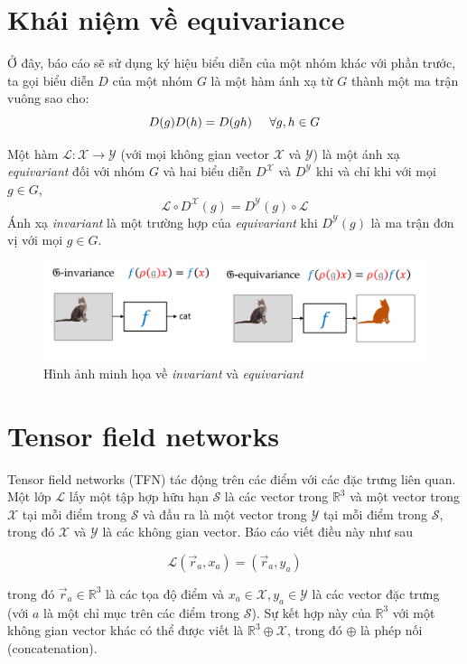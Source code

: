 \section{Khái niệm về equivariance}
Ở đây, báo cáo sẽ sử dụng ký hiệu biểu diễn của một nhóm khác với phần trước, ta gọi biểu diễn $D$ của một nhóm $G$ là một hàm ánh xạ từ $G$ thành một ma trận vuông sao cho:
$$D(g)D(h) = D(gh) \hspace{0.5cm} \forall g, h \in G$$

Một hàm $ \mathcal{L} : \mathcal{X} \to \mathcal{Y} $ (với mọi không gian vector $\mathcal{X}$ và $\mathcal{Y}$) là một ánh xạ \textit{equivariant} đối với nhóm $G$ và hai biểu diễn $D^{\mathcal{X}}$ và $D^{\mathcal{Y}}$ khi và chỉ khi với mọi $g \in G$,
$$\mathcal{L} \circ D^{\mathcal{X}}(g) = D^{\mathcal{Y}}(g) \circ \mathcal{L}$$
Ánh xạ \textit{invariant} là một trường hợp của \textit{equivariant} khi $D^{\mathcal{Y}}(g)$ là ma trận đơn vị với mọi $g \in G$.

\begin{figure}[H]
    \centering
    \includegraphics[width=1\linewidth]{Images/GDL/inva_equi.png}
    \caption{Hình ảnh minh họa về \textit{invariant} và \textit{equivariant}\cite{geometricdeep2022}}
\end{figure}

\section{Tensor field networks}
Tensor field networks (TFN) tác động trên các điểm với các đặc trưng liên quan. Một lớp \( \mathcal{L} \) lấy một tập hợp hữu hạn \( \mathcal{S} \) là các vector trong \( \mathbb{R}^3 \) và một vector trong \( \mathcal{X} \) tại mỗi điểm trong \( \mathcal{S} \) và đầu ra là một vector trong \( \mathcal{Y} \) tại mỗi điểm trong \( \mathcal{S} \), trong đó \( \mathcal{X} \) và \( \mathcal{Y} \) là các không gian vector\cite{thomas2018tensorfieldnetworksrotation}. Báo cáo viết điều này như sau

\[
\mathcal{L} (\vec{r}_a, x_a) = (\vec{r}_a, y_a)
\]

trong đó \( \vec{r}_a \in \mathbb{R}^3 \) là các tọa độ điểm và \( x_a \in \mathcal{X}, y_a \in \mathcal{Y} \) là các vector đặc trưng (với \( a \) là một chỉ mục trên các điểm trong \( \mathcal{S} \)). Sự kết hợp này của \( \mathbb{R}^3 \) với một không gian vector khác có thể được viết là \( \mathbb{R}^3 \oplus \mathcal{X} \), trong đó \( \oplus \) là phép nối (concatenation).

